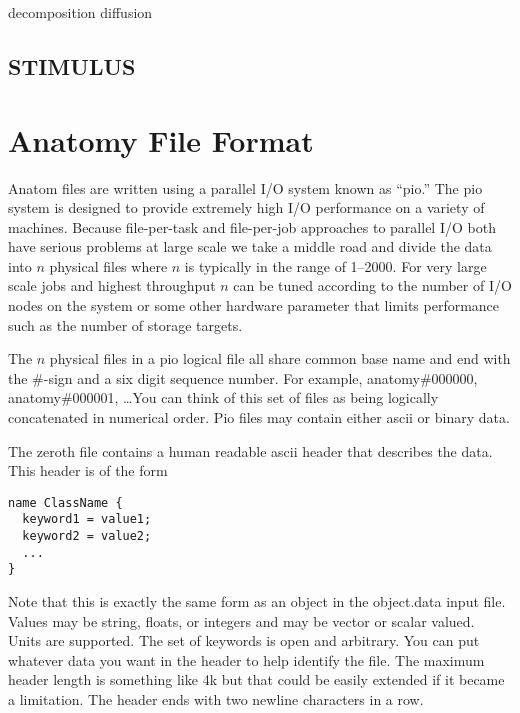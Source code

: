\documentclass{article}
\begin{document}
\begin{keywords}
  {decomposition}
  {diffusion}
\end{keywords}

\subsection{STIMULUS}

\section{Anatomy File Format}

Anatom files are written using a parallel I/O system known as ``pio.''
The pio system is designed to provide extremely high I/O performance on
a variety of machines.  Because file-per-task and file-per-job
approaches to parallel I/O both have serious problems at large scale we
take a middle road and divide the data into $n$ physical files where $n$
is typically in the range of 1--2000.  For very large scale jobs and
highest throughput $n$ can be tuned according to the number of I/O nodes
on the system or some other hardware parameter that limits performance
such as the number of storage targets.


The $n$ physical files in a pio logical file all share common base name
and end with the \#-sign and a six digit sequence number.  For example,
anatomy\#000000, anatomy\#000001, \ldots You can think of this set of
files as being logically concatenated in numerical order.  Pio files may
contain either ascii or binary data.

The zeroth file contains a human readable ascii header that describes
the data.  This header is of the form
\begin{verbatim}
name ClassName { 
  keyword1 = value1; 
  keyword2 = value2;
  ...
}
\end{verbatim}
Note that this is exactly the same form as an object in the object.data
input file.  Values may be string, floats, or integers and may be vector
or scalar valued.  Units are supported.  The set of keywords is open and
arbitrary.  You can put whatever data you want in the header to help
identify the file.  The maximum header length is something like 4k but
that could be easily extended if it became a limitation.  The header
ends with two newline characters in a row.
\end{document}
